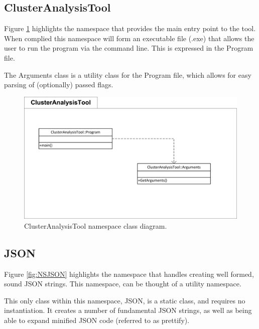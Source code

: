 \subsection{ClusterAnalysisTool}
Figure \ref{fig:NSClusterAnalysisTool} highlights the namespace that provides 
the main entry point to the tool. When complied this namespace will form an 
executable file (.exe) that allows the user to run the program via the command 
line. This is expressed in the Program file.

The Arguments class is a utility class for the Program file, which allows for 
easy parsing of (optionally) passed flags.

\begin{figure}[H]
  \centering
    \includegraphics[scale=0.9]{chapter7/class_diagrams/clusteranalysistool_namespace.png}
    \caption[ClusterAnalysisTool namespace class diagram]
            {ClusterAnalysisTool namespace class diagram.}
    \label{fig:NSClusterAnalysisTool}
\end{figure}



\subsection{JSON}
Figure \ref{fig:NSJSON} highlights the namespace that handles creating well 
formed, sound JSON strings. This namespace, can be thought of a utility 
namespace.

This only class within this namespace, JSON, is a static class, and requires no 
instantiation. It creates a number of fundamental JSON strings, as well as 
being able to expand minified JSON code (referred to as prettify).


